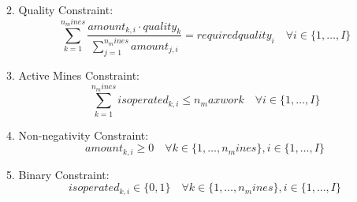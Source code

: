 \documentclass{article}
\begin{document}
2. Quality Constraint:
\[
\sum_{k=1}^{n_mines} \frac{amount_{k,i} \cdot quality_k}{\sum_{j=1}^{n_mines} amount_{j,i}} = requiredquality_i \quad \forall i \in \{1, \ldots, I\}
\]

3. Active Mines Constraint:
\[
\sum_{k=1}^{n_mines} isoperated_{k,i} \leq n_maxwork \quad \forall i \in \{1, \ldots, I\}
\]

4. Non-negativity Constraint:
\[
amount_{k,i} \geq 0 \quad \forall k \in \{1, \ldots, n_mines\}, i \in \{1, \ldots, I\}
\]

5. Binary Constraint:
\[
isoperated_{k,i} \in \{0, 1\} \quad \forall k \in \{1, \ldots, n_mines\}, i \in \{1, \ldots, I\}
\]
\end{document}
